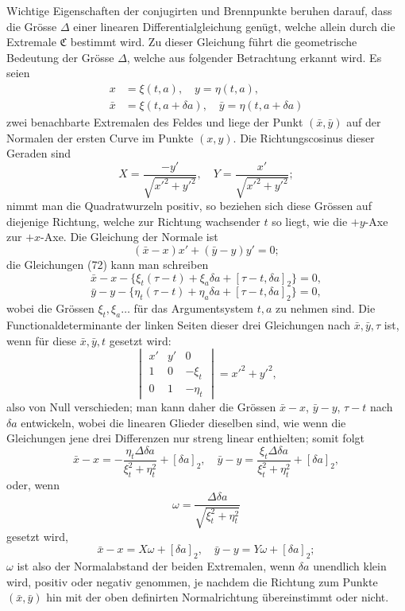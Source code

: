 \documentclass[11pt,a4paper,leqno]{article}
\begin{document}
Wichtige Eigenschaften der conjugirten und Brennpunkte beruhen darauf, dass die Grösse $\Delta$ einer linearen Differentialgleichung genügt, welche allein durch die Extremale $\mathfrak{C}$ bestimmt wird. Zu dieser Gleichung führt die geometrische Bedeutung der Grösse $\Delta$, welche aus folgender Betrachtung erkannt wird. Es seien
\begin{equation}\tag{72}
\begin{aligned}
x&=\xi(t,a),\quad y=\eta(t,a),\\
\bar x&=\xi(t,a+\delta a),\quad \bar y=\eta(t,a+\delta a)
\end{aligned}
\end{equation}
zwei benachbarte Extremalen des Feldes und liege der Punkt $(\bar x,\bar y)$ auf der Normalen der ersten Curve im Punkte $(x,y)$. Die Richtungscosinus dieser Geraden sind
\[
X=\frac{-y'}{\sqrt{x'^2+y'^2}},\quad Y=\frac{x'}{\sqrt{x'^2+y'^2}};
\]
nimmt man die Quadratwurzeln positiv, so beziehen sich diese Grössen auf diejenige Richtung, welche zur Richtung wachsender $t$ so liegt, wie die $+y$-Axe zur $+x$-Axe. Die Gleichung der Normale ist
\[
(\bar x-x)x'+(\bar y-y)y'=0;
\]
die Gleichungen (72) kann man schreiben
\[
\bar x-x-\{\xi_t(\tau-t)+\xi_a\delta a+[\tau-t,\delta a]_2\}=0,
\]
\[
\bar y-y-\{\eta_t(\tau-t)+\eta_a\delta a+[\tau-t,\delta a]_2\}=0,
\]
wobei die Grössen $\xi_t,\xi_a\ldots$ für das Argumentsystem $t,a$ zu nehmen sind. Die Functionaldeterminante der linken Seiten dieser drei Gleichungen nach $\bar x,\bar y,\tau$ ist, wenn für diese $\bar x,\bar y,t$ gesetzt wird:
\[
\begin{vmatrix}
x'&y'&0\\
1&0&-\xi_t\\
0&1&-\eta_t
\end{vmatrix}=x'^2+y'^2,
\]
also von Null verschieden; man kann daher die Grössen $\bar x-x$, $\bar y-y$, $\tau-t$ nach $\delta a$ entwickeln, wobei die linearen Glieder dieselben sind, wie wenn die Gleichungen jene drei Differenzen nur streng linear enthielten; somit folgt
\[
\bar x-x=-\frac{\eta_t\Delta\delta a}{\xi_t^2+\eta_t^2}+[\delta a]_2,\quad
\bar y-y=\frac{\xi_t\Delta\delta a}{\xi_t^2+\eta_t^2}+[\delta a]_2,
\]
oder, wenn
\begin{equation}\tag{73}
\omega=\frac{\Delta\delta a}{\sqrt{\xi_t^2+\eta_t^2}}
\end{equation}
gesetzt wird,
\[
\bar x-x=X\omega+[\delta a]_2,
\quad
\bar y-y=Y\omega+[\delta a]_2;
\]
$\omega$ ist also der Normalabstand der beiden Extremalen, wenn $\delta a$ unendlich klein wird, positiv oder negativ genommen, je nachdem die Richtung zum Punkte $(\bar x,\bar y)$ hin mit der oben definirten Normalrichtung übereinstimmt oder nicht.
\end{document}
